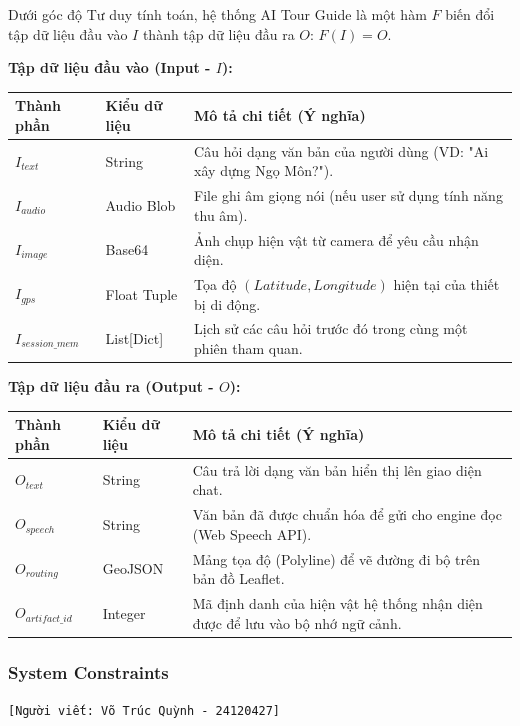 Dưới góc độ Tư duy tính toán, hệ thống AI Tour Guide là một hàm $F$ biến đổi tập dữ liệu đầu vào $I$ thành tập dữ liệu đầu ra $O$: $F(I) = O$.

\textbf{Tập dữ liệu đầu vào (Input - $I$):}
\begin{table}[H]
    \centering
    \renewcommand{\arraystretch}{1.3}
    \begin{tabular}{|p{3cm}|p{2cm}|p{9cm}|}
        \hline
        \textbf{Thành phần} & \textbf{Kiểu dữ liệu} & \textbf{Mô tả chi tiết (Ý nghĩa)} \\ \hline
        $I_{text}$ & String & Câu hỏi dạng văn bản của người dùng (VD: "Ai xây dựng Ngọ Môn?"). \\ \hline
        $I_{audio}$ & Audio Blob & File ghi âm giọng nói (nếu user sử dụng tính năng thu âm). \\ \hline
        $I_{image}$ & Base64 & Ảnh chụp hiện vật từ camera để yêu cầu nhận diện. \\ \hline
        $I_{gps}$ & Float Tuple & Tọa độ $(Latitude, Longitude)$ hiện tại của thiết bị di động. \\ \hline
        $I_{session\_mem}$ & List[Dict] & Lịch sử các câu hỏi trước đó trong cùng một phiên tham quan. \\ \hline
    \end{tabular}
\end{table}

\textbf{Tập dữ liệu đầu ra (Output - $O$):}
\begin{table}[H]
    \centering
    \renewcommand{\arraystretch}{1.3}
    \begin{tabular}{|p{3cm}|p{2cm}|p{9cm}|}
        \hline
        \textbf{Thành phần} & \textbf{Kiểu dữ liệu} & \textbf{Mô tả chi tiết (Ý nghĩa)} \\ \hline
        $O_{text}$ & String & Câu trả lời dạng văn bản hiển thị lên giao diện chat. \\ \hline
        $O_{speech}$ & String & Văn bản đã được chuẩn hóa để gửi cho engine đọc (Web Speech API). \\ \hline
        $O_{routing}$ & GeoJSON & Mảng tọa độ (Polyline) để vẽ đường đi bộ trên bản đồ Leaflet. \\ \hline
        $O_{artifact\_id}$ & Integer & Mã định danh của hiện vật hệ thống nhận diện được để lưu vào bộ nhớ ngữ cảnh. \\ \hline
    \end{tabular}
\end{table}

\subsubsection{System Constraints}
\texttt{[Người viết: Võ Trúc Quỳnh - 24120427]}

